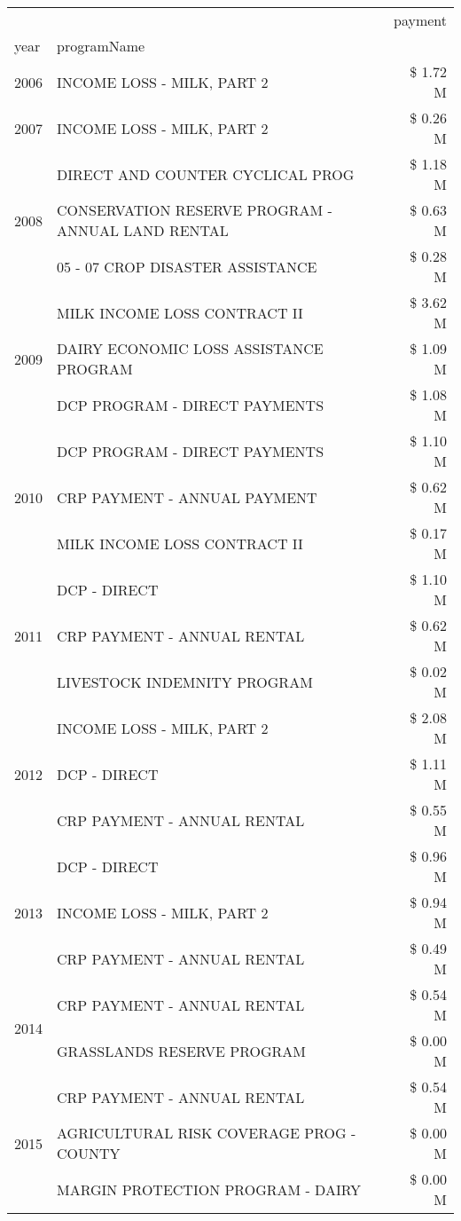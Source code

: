 \begin{tabular}{llr}
\toprule
 &  & payment \\
year & programName &  \\
\midrule
2006 & INCOME LOSS - MILK, PART 2 & \$ 1.72 M \\
\cline{1-3}
2007 & INCOME LOSS - MILK, PART 2 & \$ 0.26 M \\
\cline{1-3}
\multirow[t]{3}{*}{2008} & DIRECT AND COUNTER CYCLICAL PROG & \$ 1.18 M \\
 & CONSERVATION RESERVE PROGRAM - ANNUAL LAND RENTAL & \$ 0.63 M \\
 & 05 - 07 CROP DISASTER ASSISTANCE & \$ 0.28 M \\
\cline{1-3}
\multirow[t]{3}{*}{2009} & MILK INCOME LOSS CONTRACT II & \$ 3.62 M \\
 & DAIRY ECONOMIC LOSS ASSISTANCE PROGRAM & \$ 1.09 M \\
 & DCP PROGRAM - DIRECT PAYMENTS & \$ 1.08 M \\
\cline{1-3}
\multirow[t]{3}{*}{2010} & DCP PROGRAM - DIRECT PAYMENTS & \$ 1.10 M \\
 & CRP PAYMENT - ANNUAL PAYMENT & \$ 0.62 M \\
 & MILK INCOME LOSS CONTRACT II & \$ 0.17 M \\
\cline{1-3}
\multirow[t]{3}{*}{2011} & DCP - DIRECT & \$ 1.10 M \\
 & CRP PAYMENT - ANNUAL RENTAL & \$ 0.62 M \\
 & LIVESTOCK INDEMNITY PROGRAM & \$ 0.02 M \\
\cline{1-3}
\multirow[t]{3}{*}{2012} & INCOME LOSS - MILK, PART 2 & \$ 2.08 M \\
 & DCP - DIRECT & \$ 1.11 M \\
 & CRP PAYMENT - ANNUAL RENTAL & \$ 0.55 M \\
\cline{1-3}
\multirow[t]{3}{*}{2013} & DCP - DIRECT & \$ 0.96 M \\
 & INCOME LOSS - MILK, PART 2 & \$ 0.94 M \\
 & CRP PAYMENT - ANNUAL RENTAL & \$ 0.49 M \\
\cline{1-3}
\multirow[t]{2}{*}{2014} & CRP PAYMENT - ANNUAL RENTAL & \$ 0.54 M \\
 & GRASSLANDS RESERVE PROGRAM & \$ 0.00 M \\
\cline{1-3}
\multirow[t]{3}{*}{2015} & CRP PAYMENT - ANNUAL RENTAL & \$ 0.54 M \\
 & AGRICULTURAL RISK COVERAGE PROG - COUNTY & \$ 0.00 M \\
 & MARGIN PROTECTION PROGRAM - DAIRY & \$ 0.00 M \\

\end{tabular}
